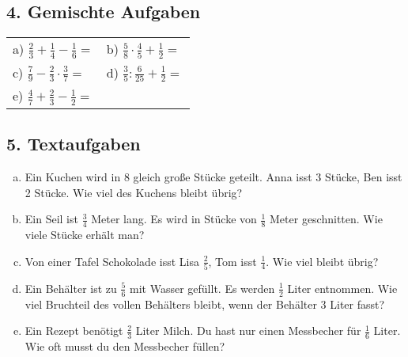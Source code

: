 \vspace{0.5cm}

\subsection*{4. Gemischte Aufgaben}
\begin{tabular}{p{} p{}}
 a) $\frac{2}{3} + \frac{1}{4} - \frac{1}{6} =$ & b) $\frac{5}{8} \cdot \frac{4}{5} + \frac{1}{2} =$ \\
 c) $\frac{7}{9} - \frac{2}{3} \cdot \frac{3}{7} =$ & d) $\frac{3}{5} : \frac{6}{25} + \frac{1}{2} =$ \\
 e) $\frac{4}{7} + \frac{2}{3} - \frac{1}{2} =$ & \\
\end{tabular}

\vspace{0.5cm}

\subsection*{5. Textaufgaben}
\begin{enumerate}[a)]
    \item Ein Kuchen wird in 8 gleich große Stücke geteilt. Anna isst 3 Stücke, Ben isst 2 Stücke. Wie viel des Kuchens bleibt übrig?
    \item Ein Seil ist $\frac{3}{4}$ Meter lang. Es wird in Stücke von $\frac{1}{8}$ Meter geschnitten. Wie viele Stücke erhält man?
    \item Von einer Tafel Schokolade isst Lisa $\frac{2}{5}$, Tom isst $\frac{1}{4}$. Wie viel bleibt übrig?
    \item Ein Behälter ist zu $\frac{5}{6}$ mit Wasser gefüllt. Es werden $\frac{1}{2}$ Liter entnommen. Wie viel Bruchteil des vollen Behälters bleibt, wenn der Behälter 3 Liter fasst?
    \item Ein Rezept benötigt $\frac{2}{3}$ Liter Milch. Du hast nur einen Messbecher für $\frac{1}{6}$ Liter. Wie oft musst du den Messbecher füllen?
\end{enumerate}

